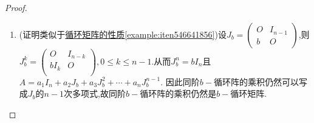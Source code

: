 \documentclass[../../main.tex]{subfiles}%
\begin{document}
\begin{proof}
\begin{enumerate}[(1)]
\item (证明类似于\hyperref[example:iten546641856]{循环矩阵的性质\ref{example:iten546641856}})设\(J_b=\begin{pmatrix}
O & I_{n - 1}\\
b & O
\end{pmatrix}\),则$J_{b}^{k}=\left( \begin{matrix}
O&		I_{n-k}\\
bI_k&		O\\
\end{matrix} \right) ,0\leqslant k\leqslant n-1$.从而\(J_b^n = bI_n\)且\(A = a_1I_n + a_2J_b + a_3J_b^2+\cdots+ a_nJ_b^{n - 1}\). 因此同阶\(b -\)循环阵的乘积仍然可以写成$J_b$的$n-1$次多项式,故同阶\(b -\)循环阵的乘积仍然是\(b -\)循环矩阵.


\end{enumerate}
\end{proof}
\end{document}
